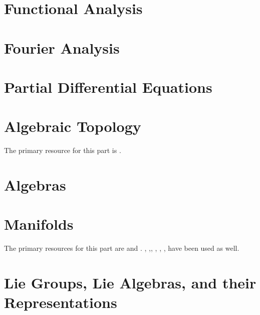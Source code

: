 \documentclass[10pt,twoside=false,open=any,numbers=noenddot]{scrbook}
\begin{document}
\part{Functional Analysis}
\label{part: Functional Analysis}
\parttoc


\part{Fourier Analysis}
\label{part:Fourier-Analysis}
\parttoc 


\part{Partial Differential Equations}
\label{part:Partial-Differential-Equations}
\parttoc


\part{ Algebraic Topology}
\vspace*{2em} The primary resource for this part is \cite{ref:hatcher_topology}.  \vspace*{1em}
\label{Algebraic Topology}
\parttoc 


\part{Algebras}
\label{Algebras}
\parttoc


\part{Manifolds}
\vspace*{2em} The primary resources for this part are \cite{ref:lee_smooth} and \cite{ref:lee_topological}. \cite{ref:lee_riemannian}, \cite{ref:lee_complex},\cite{ref:janich_vector}, \cite{ref:hubbard_vector}, \cite{ref:jost_riemannian}, \cite{ref:baez_knots}, \cite{ref:warner_manifolds} have been used as well. \vspace*{-1em}
\label{Manifolds}
\parttoc


\part{ Lie Groups, Lie Algebras, and their Representations}
\label{part: Lie Groups, Lie Algebras, and their Representations}
\parttoc


\end{document}
